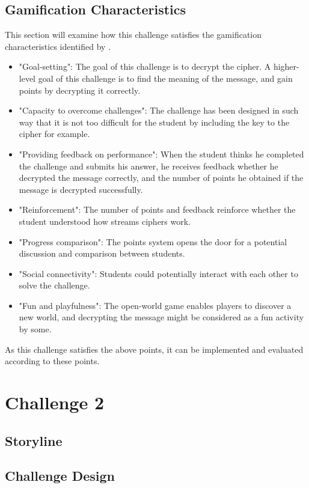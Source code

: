 \documentclass{l4proj}
\begin{document}
\subsection{Gamification Characteristics}
This section will examine how this challenge satisfies the gamification characteristics identified
by \citet{cugelman_gamification:_2013}.
\begin{itemize}
    \item "Goal-setting": The goal of this challenge is to decrypt the cipher. 
    A higher-level goal of this challenge is to find the meaning of the message, 
    and gain points by decrypting it correctly.
    \item "Capacity to overcome challenges": The challenge has been designed in such way 
    that it is not too difficult for the student by including the key to the cipher for example.
    \item "Providing feedback on performance": When the student thinks he completed the challenge and submits his answer,
    he receives feedback whether he decrypted the message correctly, 
    and the number of points he obtained if the message is decrypted successfully.
    \item "Reinforcement": The number of points and feedback reinforce whether the student understood how streams ciphers work.
    \item "Progress comparison": The points system opens the door for a potential discussion and comparison between students.
    \item "Social connectivity": Students could potentially interact with each other to solve the challenge.
    \item "Fun and playfulness": The open-world game enables players to discover a new world, 
    and decrypting the message might be considered as a fun activity by some.
\end{itemize}
As this challenge satisfies the above points, 
it can be implemented and evaluated according to these points.

\section{Challenge 2}

\subsection{Storyline}

\subsection{Challenge Design}
\end{document}
